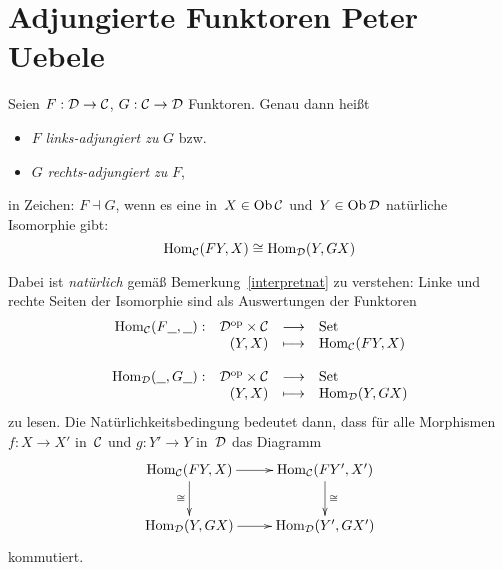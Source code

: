 \section[Adjungierte Funktoren]{Adjungierte Funktoren \hfill \small Peter
Uebele}




\begin{defn}
Seien $F:\mathcal{D}\to\mathcal{C}$, $G:\mathcal{C}\to\mathcal{D}$ Funktoren. Genau dann heißt
\begin{itemize}
\item 
$F$ \emph{links-adjungiert zu} $G$ bzw.
\item 
$G$ \emph{rechts-adjungiert zu} $F$,
\end{itemize}
in Zeichen: $F \dashv G$, wenn es eine in~$X \in \operatorname{Ob}\mathcal{C}$ und~$Y \in \operatorname{Ob}\mathcal{D}$ natürliche
Isomorphie gibt:
\[ \mathrm{Hom}_{\mathcal{C}}(FY,X) \cong \mathrm{Hom}_{\mathcal{D}}(Y,GX) \]
\end{defn}
Dabei ist \emph{natürlich} gemäß Bemerkung~\ref{interpretnat} zu verstehen:
Linke und rechte Seiten der Isomorphie sind als Auswertungen der Funktoren
\[ \begin{array}{@{}rrcl@{}}
  \Hom_\C(F\freist,\freist) :&
    \D^\op \times \C &\longrightarrow& \Set \\
  & (Y,X) &\longmapsto& \Hom_\C(FY, X) \\\\
  \Hom_\D(\freist,G\freist) :&
    \D^\op \times \C &\longrightarrow& \Set \\
  & (Y,X) &\longmapsto& \Hom_\D(Y, GX)
\end{array} \]
zu lesen. Die Natürlichkeitsbedingung bedeutet dann, dass
für alle Morphismen $f:X\rightarrow X'$ in~$\mathcal{C}$ und
$g:Y'\rightarrow Y$ in~$\mathcal{D}$ das Diagramm
\[ \xymatrix{
  \Hom_\C(FY,X) \ar[d]_\cong \ar[r] & \Hom_\C(FY',X') \ar[d]^\cong \\
  \Hom_\D(Y,GX) \ar[r] & \Hom_\D(Y',GX')
} \]
kommutiert.

